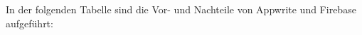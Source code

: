 In der folgenden Tabelle sind die Vor- und Nachteile von Appwrite und Firebase aufgeführt:










